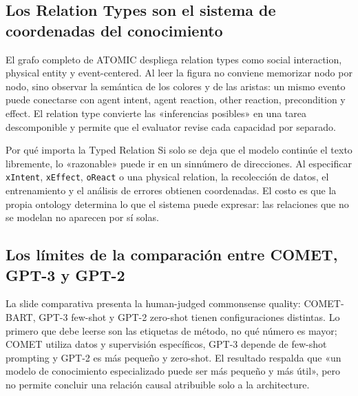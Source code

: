 \subsection{Los Relation Types son el sistema de coordenadas del conocimiento}

El grafo completo de ATOMIC despliega relation types como social interaction, physical entity y event-centered. Al leer la figura no conviene memorizar nodo por nodo, sino observar la semántica de los colores y de las aristas: un mismo evento puede conectarse con agent intent, agent reaction, other reaction, precondition y effect. El relation type convierte las «inferencias posibles» en una tarea descomponible y permite que el evaluator revise cada capacidad por separado.


\begin{knowledgebox}{Por qué importa la Typed Relation}
Si solo se deja que el modelo continúe el texto libremente, lo «razonable» puede ir en un sinnúmero de direcciones. Al especificar \texttt{xIntent}, \texttt{xEffect}, \texttt{oReact} o una physical relation, la recolección de datos, el entrenamiento y el análisis de errores obtienen coordenadas. El costo es que la propia ontology determina lo que el sistema puede expresar: las relaciones que no se modelan no aparecen por sí solas.
\end{knowledgebox}

\subsection{Los límites de la comparación entre COMET, GPT-3 y GPT-2}

La slide comparativa presenta la human-judged commonsense quality: COMET-BART, GPT-3 few-shot y GPT-2 zero-shot tienen configuraciones distintas. Lo primero que debe leerse son las etiquetas de método, no qué número es mayor; COMET utiliza datos y supervisión específicos, GPT-3 depende de few-shot prompting y GPT-2 es más pequeño y zero-shot. El resultado respalda que «un modelo de conocimiento especializado puede ser más pequeño y más útil», pero no permite concluir una relación causal atribuible solo a la architecture.


